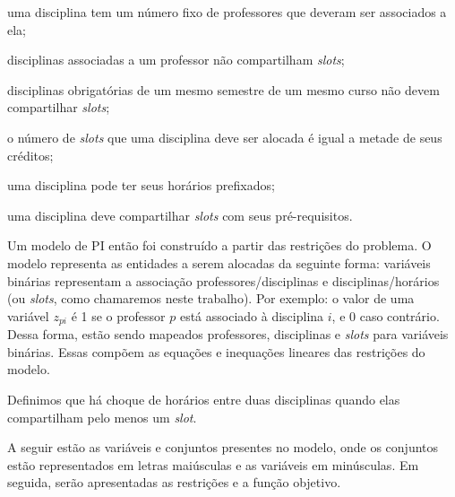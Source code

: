 \begin{alineascomponto}
\item uma disciplina tem um número fixo de professores que deveram ser associados a ela;
\item disciplinas associadas a um professor não compartilham \textit{slots};
\item disciplinas obrigatórias de um mesmo semestre de um mesmo curso não devem compartilhar \textit{slots};
\item o número de \textit{slots} que uma disciplina deve ser alocada é igual a metade de seus créditos;
\item uma disciplina pode ter seus horários prefixados;
\item uma disciplina deve compartilhar \textit{slots} com seus pré-requisitos.
\end{alineascomponto} 

Um modelo de PI então foi construído a partir das restrições do problema. O modelo representa as entidades a serem alocadas da seguinte forma: variáveis binárias representam a associação professores/disciplinas e disciplinas/horários (ou \textit{slots}, como chamaremos neste trabalho). Por exemplo: o valor de uma variável $z_{pi}$ é 1 se o professor $p$ está associado à disciplina $i$, e 0 caso contrário. Dessa forma, estão sendo mapeados professores, disciplinas e \textit{slots} para variáveis binárias. Essas compõem as equações e inequações lineares das restrições do modelo.

Definimos que há choque de horários entre duas disciplinas quando elas compartilham pelo menos um \textit{slot}.

A seguir estão as variáveis e conjuntos presentes no modelo, onde os conjuntos estão representados em letras maiúsculas e as variáveis em minúsculas. Em seguida, serão apresentadas as restrições e a função objetivo.

